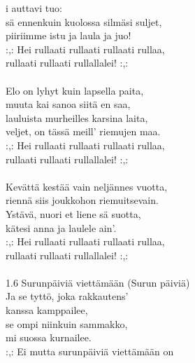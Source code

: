 i auttavi tuo: \\ sä ennenkuin kuolossa silmäsi suljet, \\ piiriimme istu ja laula ja juo! \\ :,: Hei rullaati rullaati rullaati rullaa, \\ rullaati rullaati rullallalei! :,: \\ \hspace{10mm} \\ Elo on lyhyt kuin lapsella paita, \\ muuta kai sanoa siitä en saa, \\ lauluista murheilles karsina laita, \\ veljet, on tässä meill' riemujen maa. \\ :,: Hei rullaati rullaati rullaati rullaa, \\ rullaati rullaati rullallalei! :,: \\ \hspace{10mm} \\ Kevättä kestää vain neljännes vuotta, \\ riennä siis joukkohon riemuitsevain. \\ Ystävä, nuori et liene sä suotta, \\ kätesi anna ja laulele ain'. \\ :,: Hei rullaati rullaati rullaati rullaa, \\ rullaati rullaati rullallalei! :,:  \\ \hspace{10mm} \\ 1.6 Surunpäiviä viettämään (Surun päiviä) \\ Ja se tyttö, joka rakkautens'  \\ kanssa kamppailee, \\ se ompi niinkuin sammakko,  \\ mi suossa kurnailee. \\ :,: Ei mutta surunpäiviä viettämään on 